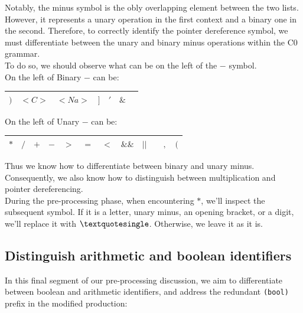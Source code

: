 Notably, the minus symbol is the obly overlapping element between the two lists. However, it represents a unary operation in the first context and a binary one in the second. Therefore, to correctly identify the pointer dereference symbol, we must differentiate between the unary and binary minus operations within the C0 grammar.\\

To do so, we should observe what can be on the left of the \(-\) symbol.\\

On the left of Binary \(-\) can be:
\begin{center}
    \begin{tabular}{|c|c|c|c|c|c|c|}
        \hline
        \( ) \) & \( <C> \) & \( <Na> \) & \( ] \) & \( ' \) & \( \& \)\\
        \hline
    \end{tabular}
\end{center}

On the left of Unary \(-\) can be:
\begin{center}
    \begin{tabular}{|c|c|c|c|c|c|c|c|c|c|c|c|}
        \hline
        \( \ast \) & \( / \) & \( + \) & \( - \) & \( > \) & \( = \) & \( < \) & \( \&\& \) & \( || \) & \( \) & \( , \) & \( ( \)\\
        \hline
    \end{tabular}
\end{center}

Thus we know how to differentiate between binary and unary minus. Consequently, we also know how to distinguish between multiplication and pointer dereferencing.\\

During the pre-processing phase, when encountering \(\ast\), we'll inspect the subsequent symbol. If it is a letter, unary minus, an opening bracket, or a digit, we'll replace it with \(\textquotesingle\). Otherwise, we leave it as it is.

\vspace{30pt}

\subsection{Distinguish arithmetic and boolean identifiers}

In this final segment of our pre-processing discussion, we aim to differentiate between boolean and arithmetic identifiers, and address the redundant \texttt{(bool)} prefix in the modified production:

